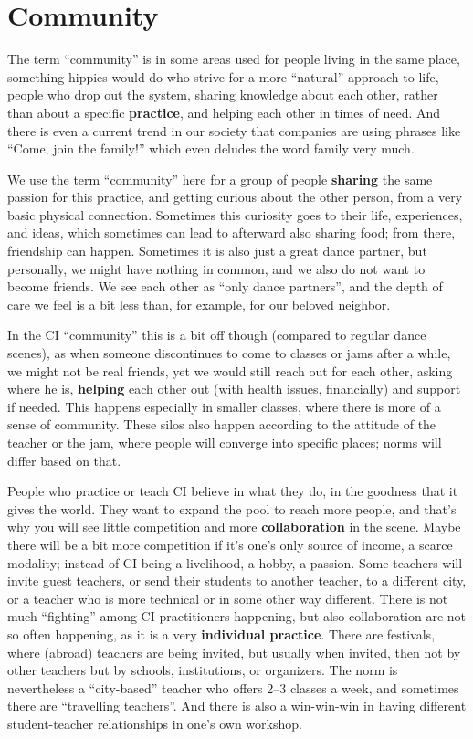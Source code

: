 \section{Community}\label{sec:community}

The term ``community'' is in some areas used for people living in the same place, something hippies would do who strive for a more ``natural'' approach to life, people who drop out the system, sharing knowledge about each other, rather than about a specific \textbf{practice}, and helping each other in times of need.
And there is even a current trend in our society that companies are using phrases like ``Come, join the family!'' which even deludes the word family very much.

We use the term ``community'' here for a group of people \textbf{sharing} the same passion for this practice, and getting curious about the other person, from a very basic physical connection.
Sometimes this curiosity goes to their life, experiences, and ideas, which sometimes can lead to afterward also sharing food; from there, friendship can happen.
Sometimes it is also just a great dance partner, but personally, we might have nothing in common, and we also do not want to become friends.
We see each other as ``only dance partners'', and the depth of care we feel is a bit less than, for example, for our beloved neighbor.

In the CI ``community'' this is a bit off though (compared to regular dance scenes), as when someone discontinues to come to classes or jams after a while, we might not be real friends, yet we would still reach out for each other, asking where he is, \textbf{helping} each other out (with health issues, financially) and support if needed.
This happens especially in smaller classes, where there is more of a sense of community.
These silos also happen according to the attitude of the teacher or the jam, where people will converge into specific places; norms will differ based on that.

People who practice or teach CI believe in what they do, in the goodness that it gives the world.
They want to expand the pool to reach more people, and that's why you will see little competition and more \textbf{collaboration} in the scene.
Maybe there will be a bit more competition if it's one's only source of income, a scarce modality; instead of CI being a livelihood, a hobby, a passion.
Some teachers will invite guest teachers, or send their students to another teacher, to a different city, or a teacher who is more technical or in some other way different.
There is not much ``fighting'' among CI practitioners happening, but also collaboration are not so often happening, as it is a very \textbf{individual practice}.
There are festivals, where (abroad) teachers are being invited, but usually when invited, then not by other teachers but by schools, institutions, or organizers.
The norm is nevertheless a ``city-based'' teacher who offers 2--3 classes a week, and sometimes there are ``travelling teachers''.
And there is also a win-win-win in having different student-teacher relationships in one's own workshop.

